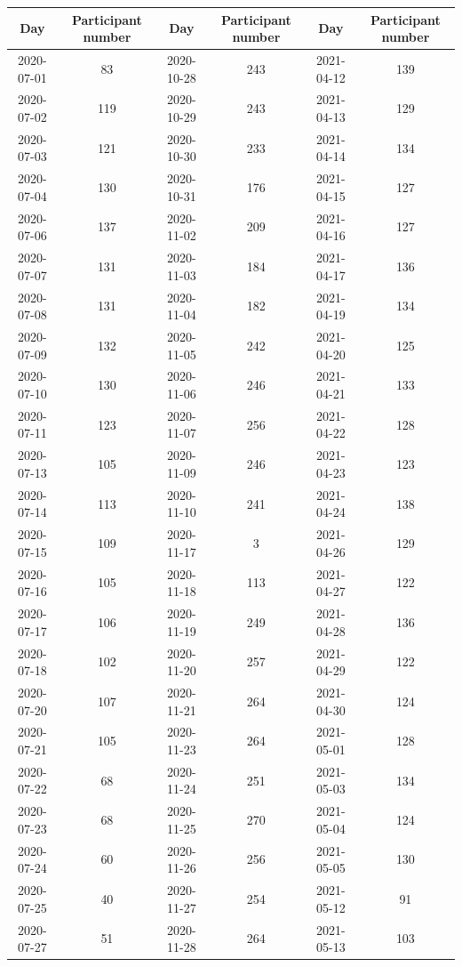 \begin{table}[ht]
\centering
\begin{tabular}{|cc|cc|cc}
  \hline
Day & Participant number & Day & Participant number & Day & Participant number \\ 
  \hline
2020-07-01 & 83 & 2020-10-28 & 243 & 2021-04-12 & 139 \\ 
  2020-07-02 & 119 & 2020-10-29 & 243 & 2021-04-13 & 129 \\ 
  2020-07-03 & 121 & 2020-10-30 & 233 & 2021-04-14 & 134 \\ 
  2020-07-04 & 130 & 2020-10-31 & 176 & 2021-04-15 & 127 \\ 
  2020-07-06 & 137 & 2020-11-02 & 209 & 2021-04-16 & 127 \\ 
  2020-07-07 & 131 & 2020-11-03 & 184 & 2021-04-17 & 136 \\ 
  2020-07-08 & 131 & 2020-11-04 & 182 & 2021-04-19 & 134 \\ 
  2020-07-09 & 132 & 2020-11-05 & 242 & 2021-04-20 & 125 \\ 
  2020-07-10 & 130 & 2020-11-06 & 246 & 2021-04-21 & 133 \\ 
  2020-07-11 & 123 & 2020-11-07 & 256 & 2021-04-22 & 128 \\ 
  2020-07-13 & 105 & 2020-11-09 & 246 & 2021-04-23 & 123 \\ 
  2020-07-14 & 113 & 2020-11-10 & 241 & 2021-04-24 & 138 \\ 
  2020-07-15 & 109 & 2020-11-17 & 3 & 2021-04-26 & 129 \\ 
  2020-07-16 & 105 & 2020-11-18 & 113 & 2021-04-27 & 122 \\ 
  2020-07-17 & 106 & 2020-11-19 & 249 & 2021-04-28 & 136 \\ 
  2020-07-18 & 102 & 2020-11-20 & 257 & 2021-04-29 & 122 \\ 
  2020-07-20 & 107 & 2020-11-21 & 264 & 2021-04-30 & 124 \\ 
  2020-07-21 & 105 & 2020-11-23 & 264 & 2021-05-01 & 128 \\ 
  2020-07-22 & 68 & 2020-11-24 & 251 & 2021-05-03 & 134 \\ 
  2020-07-23 & 68 & 2020-11-25 & 270 & 2021-05-04 & 124 \\ 
  2020-07-24 & 60 & 2020-11-26 & 256 & 2021-05-05 & 130 \\ 
  2020-07-25 & 40 & 2020-11-27 & 254 & 2021-05-12 & 91 \\ 
  2020-07-27 & 51 & 2020-11-28 & 264 & 2021-05-13 & 103 \\ 

\end{tabular}
\end{table}
